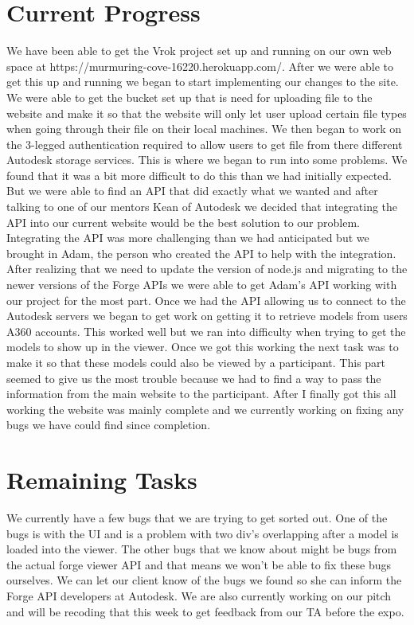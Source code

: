 \documentclass[10pt,draftclsnofoot,onecolumn]{IEEEtran}
\begin{document}
\section{Current Progress}
We have been able to get the Vrok project set up and running on our own web space at https://murmuring-cove-16220.herokuapp.com/. After we were able to get this up and running we began to start implementing our changes to the site. We were able to get the bucket set up that is need for uploading file to the website and make it so that the website will only let user upload certain file types when going through their file on their local machines. We then began to work on the 3-legged authentication required to allow users to get file from there different Autodesk storage services. This is where we began to run into some problems. We found that it was a bit more difficult to do this than we had initially expected. But we were able to find an API that did exactly what we wanted and after talking to one of our mentors Kean of Autodesk we decided that integrating the API into our current website would be the best solution to our problem. Integrating the API was more challenging than we had anticipated but we brought in Adam, the person who created the API to help with the integration. After realizing that we need to update the version of node.js and migrating to the newer versions of the Forge APIs we were able to get Adam's API working with our project for the most part. Once we had the API allowing us to connect to the Autodesk servers we began to get work on getting it to retrieve models from users A360 accounts. This worked well but we ran into difficulty when trying to get the models to show up in the viewer. Once we got this working the next task was to make it so that these models could also be viewed by a participant. This part seemed to give us the most trouble because we had to find a way to pass the information from the main website to the participant. After I finally got this all working the website was mainly complete and we currently working on fixing any bugs we have could find since completion.

\section{Remaining Tasks}
We currently have a few bugs that we are trying to get sorted out. One of the bugs is with the UI and is a problem with two div’s overlapping after a model is loaded into the viewer. The other bugs that we know about might be bugs from the actual forge viewer API and that means we won't be able to fix these bugs ourselves. We can let our client know of the bugs we found so she can inform the Forge API developers at Autodesk. We are also currently working on our pitch and will be recoding that this week to get feedback from our TA before the expo.
\end{document}
